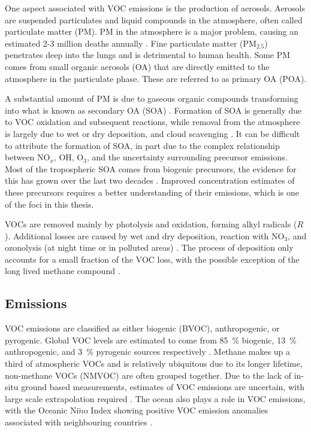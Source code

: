   One aspect associated with VOC emissions is the production of aerosols.
  Aerosols are suspended particulates and liquid compounds in the atmosphere, often called particulate matter (PM).
  PM in the atmosphere is a major problem, causing an estimated 2-3 million deaths annually \parencite{Hoek2013, Krewski2009, Silva2013, Lelieveld2015}. 
  Fine particulate matter (PM$_{2.5}$) penetrates deep into the lungs and is detrimental to human health.
  Some PM comes from small organic aerosols (OA) that are directly emitted to the atmosphere in the particulate phase. 
  These are referred to as primary OA (POA).
  
  A substantial amount of PM is due to gaseous organic compounds transforming into what is known as secondary OA (SOA) \parencite{Kroll2008}.
  Formation of SOA is generally due to VOC oxidation and subsequent reactions, while removal from the atmosphere is largely due to wet or dry deposition, and cloud scavenging \parencite{Kanakidou2005}.
  It can be difficult to attribute the formation of SOA, in part due to the complex relationship between NO$_x$, OH, O$_3$, and the uncertainty surrounding precursor emissions.
  Most of the tropospheric SOA comes from biogenic precursors, the evidence for this has grown over the last two decades \parencite{Guenther1995, Kanakidou2005,Guenther2012}.
  Improved concentration estimates of these precursors requires a better understanding of their emissions, which is one of the foci in this thesis.
  
  VOCs are removed mainly by photolysis and oxidation, forming alkyl radicals ($R\dot{}$).
  Additional losses are caused by wet and dry deposition, reaction with NO$_3$, and ozonolysis (at night time or in polluted areas) \parencite{AtkinsonArey2003, Brown2009}.
  The process of deposition only accounts for a small fraction of the VOC loss, with the possible exception of the long lived methane compound \parencite{AtkinsonArey2003}.
  
  
  \subsection{Emissions}
    \label{LR:VOCs:Emissions}
    
    VOC emissions are classified as either biogenic (BVOC), anthropogenic, or pyrogenic.
    Global VOC levels are estimated to come from 85~\% biogenic, 13~\% anthropogenic, and 3~\% pyrogenic sources respectively \parencite{Kanakidou2005, Kefauver2014}.
    Methane makes up a third of atmospheric VOCs and is relatively ubiquitous due to its longer lifetime, non-methane VOCs (NMVOC) are often grouped together.
    Due to the lack of in-situ ground based measurements, estimates of VOC emissions are uncertain, with large scale extrapolation required \parencite{Millet2006}.
    The ocean also plays a role in VOC emissions, with the Oceanic Ni$\tilde{n}$o Index showing positive VOC emission anomalies associated with neighbouring countries \parencite{Stavrakou2014}.
    
